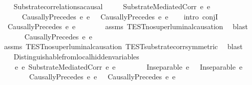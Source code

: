 \begin{isabellebody}
\isanewline
\ \ \isamarkupfalse%
\ Substrate{\isacharunderscore}{\kern0pt}correlations{\isacharunderscore}{\kern0pt}acausal{\isacharcolon}{\kern0pt}\isanewline
\ \ \ \ \ {\isachardoublequoteopen}SubstrateMediatedCorr\ e{}\ e{}{\isachardoublequoteclose}\isanewline
\ \ \ \ \ {\isachardoublequoteopen}{\isasymnot}\ CausallyPrecedes\ e{}\ e{}\ {\isasymand}\ {\isasymnot}\ CausallyPrecedes\ e{}\ e{}{\isachardoublequoteclose}\isanewline
%
\isadelimproof
\ \ %
\endisadelimproof
%
\isatagproof
{}\isamarkupfalse%
\ {\isacharparenleft}{\kern0pt}intro\ conjI{\isacharparenright}{\kern0pt}\isanewline
\ \ \ \ \isamarkupfalse%
\ {\isachardoublequoteopen}{\isasymnot}\ CausallyPrecedes\ e{}\ e{}{\isachardoublequoteclose}\isanewline
\ \ \ \ \ \ \isamarkupfalse%
\ assms\ TEST{}{\isacharunderscore}{\kern0pt}no{\isacharunderscore}{\kern0pt}superluminal{\isacharunderscore}{\kern0pt}causation\ \isamarkupfalse%
\ blast\isanewline
\ \ \isamarkupfalse%
\isanewline
\ \ \ \ \isamarkupfalse%
\ {\isachardoublequoteopen}{\isasymnot}\ CausallyPrecedes\ e{}\ e{}{\isachardoublequoteclose}\isanewline
\ \ \ \ \ \ \isamarkupfalse%
\ assms\ TEST{}{\isacharunderscore}{\kern0pt}no{\isacharunderscore}{\kern0pt}superluminal{\isacharunderscore}{\kern0pt}causation\ TEST{}{\isacharunderscore}{\kern0pt}substrate{\isacharunderscore}{\kern0pt}corr{\isacharunderscore}{\kern0pt}symmetric\ \isamarkupfalse%
\ blast\isanewline
\ \ \isamarkupfalse%
%
\endisatagproof
{\isafoldproof}%
%
\isadelimproof
\isanewline
%
\endisadelimproof
\isanewline
\ \ \isamarkupfalse%
\ Distinguishable{\isacharunderscore}{\kern0pt}from{\isacharunderscore}{\kern0pt}local{\isacharunderscore}{\kern0pt}hidden{\isacharunderscore}{\kern0pt}variables{\isacharcolon}{\kern0pt}\isanewline
\ \ \ \ {\isachardoublequoteopen}{\isasymforall}e{}\ e{}{\isachardot}{\kern0pt}\ SubstrateMediatedCorr\ e{}\ e{}\ {\isasymlongrightarrow}\isanewline
\ \ \ \ \ \ \ Inseparable\ e{}\ {\isasymOmega}\ {\isasymand}\ Inseparable\ e{}\ {\isasymOmega}\ {\isasymand}\isanewline
\ \ \ \ \ \ \ {\isasymnot}\ CausallyPrecedes\ e{}\ e{}\ {\isasymand}\ {\isasymnot}\ CausallyPrecedes\ e{}\ e{}{\isachardoublequoteclose}\isanewline

\end{isabellebody}
